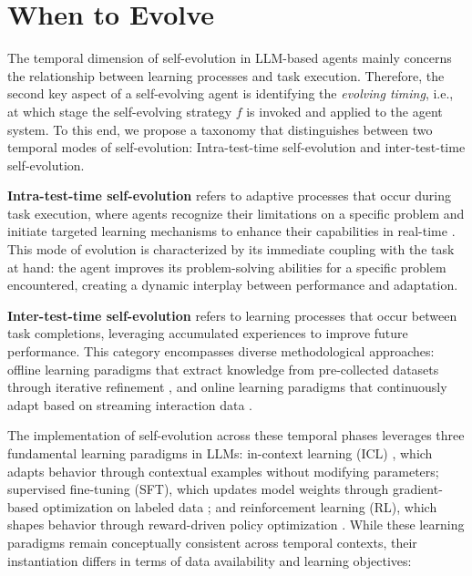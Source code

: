 \section{When to Evolve}
\label{sec:when}
The temporal dimension of self-evolution in LLM-based agents mainly concerns the relationship between learning processes and task execution. Therefore, the second key aspect of a self-evolving agent is identifying the \textit{evolving timing}, i.e., at which stage the self-evolving strategy $f$ is invoked and applied to the agent system. To this end, we propose a taxonomy that distinguishes between two temporal modes of self-evolution: Intra-test-time self-evolution and inter-test-time self-evolution.

\textbf{Intra-test-time self-evolution} refers to adaptive processes that occur during task execution, where agents recognize their limitations on a specific problem and initiate targeted learning mechanisms to enhance their capabilities in real-time \citep{xi2024enhancing, bi2024forest}. This mode of evolution is characterized by its immediate coupling with the task at hand: the agent improves its problem-solving abilities for a specific problem encountered, creating a dynamic interplay between performance and adaptation.

\textbf{Inter-test-time self-evolution} refers to learning processes that occur between task completions, leveraging accumulated experiences to improve future performance. This category encompasses diverse methodological approaches: offline learning paradigms that extract knowledge from pre-collected datasets through iterative refinement \citep{zelikman2022star, zelikman2024quiet}, and online learning paradigms that continuously adapt based on streaming interaction data \citep{qi2024webrl, qiu2025alita, qian2024new, wang2025mobile}. 

The implementation of self-evolution across these temporal phases leverages three fundamental learning paradigms in LLMs: in-context learning (ICL) \citep{dong2022survey, min2021metaicl, wies2023learnability}, which adapts behavior through contextual examples without modifying parameters; supervised fine-tuning (SFT), which updates model weights through gradient-based optimization on labeled data \citep{devlin2018bert, shen2024rethinking, dong2023abilities}; and reinforcement learning (RL), which shapes behavior through reward-driven policy optimization \citep{kaelbling1996reinforcement, sun2024llm,zhang2025nemotron}. While these learning paradigms remain conceptually consistent across temporal contexts, their instantiation differs in terms of data availability and learning objectives:



